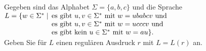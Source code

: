 
\begin{exercise}

Gegeben sind das Alphabet $\Sigma=\{a,b,c\}$ und die Sprache\\[0.2cm]
      $L= \{w\in \Sigma^* \mid
      \begin{array}[t]{@{\,}l}
        \mbox{es gibt } u,v\in \Sigma^* \mbox{
        mit } w = u babc v \mbox{ und }\\
        \mbox{es gibt } u,v\in \Sigma^* \mbox{
        mit } w = u ccc v \mbox{ und }\\
        \mbox{es gibt kein } u \in \Sigma^*
        \mbox{ mit } w = au\} .
      \end{array}
     $\\[0.2cm]
Geben Sie für
  $L$ einen regulären Ausdruck $r$ mit $L=L(r)$ an.

\end{exercise}

